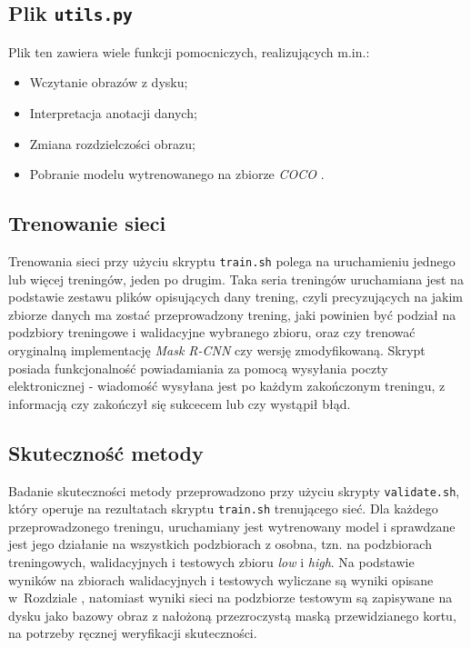 \subsection*{Plik \texttt{utils.py}}

Plik ten zawiera wiele funkcji pomocniczych, realizujących m.in.:
\begin{itemize}
  \item Wczytanie obrazów z dysku;
  \item Interpretacja anotacji danych;
  \item Zmiana rozdzielczości obrazu;
  \item Pobranie modelu wytrenowanego na zbiorze \textit{COCO} \cite{coco}.
\end{itemize}

\subsection*{Trenowanie sieci}

Trenowania sieci przy użyciu skryptu \texttt{train.sh} polega na uruchamieniu jednego lub więcej treningów, jeden po drugim. Taka seria treningów uruchamiana jest na podstawie zestawu plików opisujących dany trening, czyli precyzujących na jakim zbiorze danych ma zostać przeprowadzony trening, jaki powinien być podział na podzbiory treningowe i walidacyjne wybranego zbioru, oraz czy trenować oryginalną implementację \textit{Mask R-CNN} czy wersję zmodyfikowaną. Skrypt posiada funkcjonalność powiadamiania za pomocą wysyłania poczty elektronicznej - wiadomość wysyłana jest po każdym zakończonym treningu, z informacją czy zakończył się sukcecem lub czy wystąpił błąd.

\subsection*{Skuteczność metody}

Badanie skuteczności metody przeprowadzono przy użyciu skrypty \texttt{validate.sh}, który operuje na rezultatach skryptu \texttt{train.sh} trenującego sieć.
Dla każdego przeprowadzonego treningu, uruchamiany jest wytrenowany model i sprawdzane jest jego działanie na wszystkich podzbiorach z osobna, tzn. na podzbiorach treningowych, walidacyjnych i testowych zbioru \textit{low} i \textit{high}. Na podstawie wyników na zbiorach walidacyjnych i testowych wyliczane są wyniki opisane w~Rozdziale , natomiast wyniki sieci na podzbiorze testowym są zapisywane na dysku jako bazowy obraz z nałożoną przezroczystą maską przewidzianego kortu, na potrzeby ręcznej weryfikacji skuteczności.
